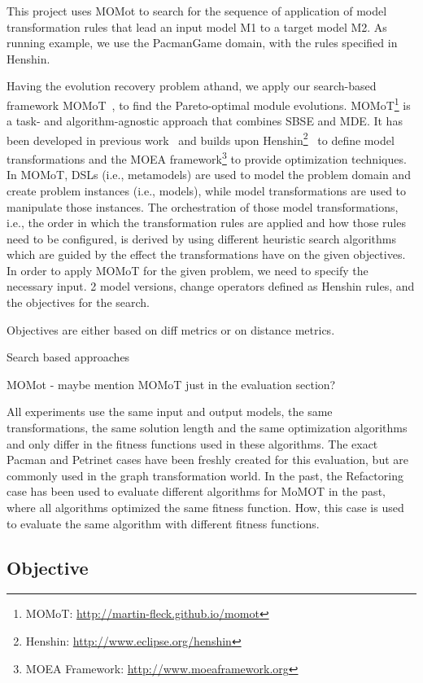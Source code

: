 This project uses MOMot to search for the sequence of application of model transformation rules that lead an input model M1 to a target model M2. As running example, we use the PacmanGame domain, with the rules specified in Henshin.

Having the evolution recovery problem athand, we apply our search-based framework MOMoT~\cite{Fleck15,FleckTW16}, to find the Pareto-optimal module evolutions. MOMoT\footnote{MOMoT: \url{http://martin-fleck.github.io/momot}} is a task- and algorithm-agnostic approach that combines SBSE and MDE.
It has been developed in previous work~\cite{Fleck15} and builds upon Henshin\footnote{Henshin: \url{http://www.eclipse.org/henshin}}~\cite{Arendt10} to define model transformations and the MOEA framework\footnote{MOEA Framework: \url{http://www.moeaframework.org}} to provide optimization techniques. In MOMoT, DSLs (i.e., metamodels) are used to model the problem domain and create problem instances (i.e., models), while model transformations are used to manipulate those instances.
The orchestration of those model transformations, i.e., the order in which the transformation rules are applied and how those rules need to be configured, is derived by using different heuristic search algorithms which are guided by the effect the transformations have on the given objectives.
In order to apply MOMoT for the given problem, we need to specify the necessary input.
2 model versions, change operators defined as Henshin rules, and the objectives for the search.

Objectives are either based on diff metrics or on distance metrics.


Search based approaches

MOMot - maybe mention MOMoT just in the evaluation section?


 All experiments use the same input and output models, the same transformations, the same solution length and the 
same optimization algorithms and only differ in the fitness functions used in these algorithms. 
The exact Pacman and Petrinet cases have been freshly created for this evaluation, but are commonly used in the graph transformation world.
In the past, the Refactoring case has been used to evaluate different algorithms for MoMOT in the past, where all algorithms optimized the same fitness function. How, this case is used to evaluate the same algorithm with different fitness functions.


\subsection{Objective}

